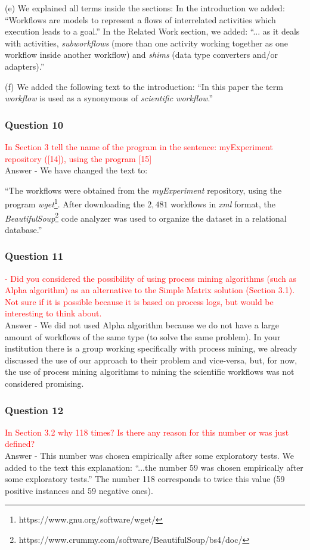 \documentclass{report}
\begin{document}
(e) We explained all terms inside the sections: In the introduction we added: ``Workflows are models to represent a flows of interrelated activities which execution leads to a goal.'' In the Related Work section, we added: ``... as it deals with activities, \emph{subworkflows} (more than one activity working together as one workflow inside another workflow) and \emph{shims} (data type converters and/or adapters).''

(f) We added the following text to the introduction: ``In this paper the term \emph{workflow} is used as a synonymous of \emph{scientific workflow}.''



\subsubsection{Question 10}
\textcolor{red}{In Section 3 tell the name of the program in the sentence: myExperiment repository ([14]), using the program [15]}
\\
Answer -  We have changed the text to:

``The workflows were obtained from the \emph{myExperiment} repository, using the program \emph{wget}\footnote{https://www.gnu.org/software/wget/}. After downloading the $2,481$ workflows in \emph{xml} format, the \emph{BeautifulSoup}\footnote{https://www.crummy.com/software/BeautifulSoup/bs4/doc/} code analyzer was used to organize the dataset in a relational database.''

\subsubsection{Question 11}
\textcolor{red}{- Did you considered the possibility of using process mining algorithms
	(such as Alpha algorithm) as an alternative to the Simple Matrix solution
	(Section 3.1). Not sure if it is possible because it is based on process
	logs, but would be interesting to think about.
}
\\
Answer - We did not used Alpha algorithm because we do not have a large amount of workflows of the same type (to solve the same problem). In your institution there is a group working specifically with process mining, we already discussed the use of our approach to their problem and vice-versa, but, for now, the use of process mining algorithms to mining the scientific workflows was not considered promising.


\subsubsection{Question 12}
\textcolor{red}{In Section 3.2 why 118 times? Is there any reason for this number or was
	just defined?
}
\\
Answer - This number was chosen empirically after some exploratory tests. We added to the text this explanation: ``...the number 59 was chosen empirically after some exploratory tests.'' The number 118 corresponds to twice this value (59 positive instances and 59 negative ones).
\end{document}
